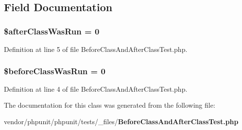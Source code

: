 \subsection{Field Documentation}
\subsubsection[{\$after\+Class\+Was\+Run}]{\setlength{\rightskip}{0pt plus 5cm}\$after\+Class\+Was\+Run = 0\hspace{0.3cm}{\ttfamily [static]}}\label{class_before_class_and_after_class_test_a46cf5fb3e71df7ff80751333fd0a9cff}


Definition at line 5 of file Before\+Class\+And\+After\+Class\+Test.\+php.

\subsubsection[{\$before\+Class\+Was\+Run}]{\setlength{\rightskip}{0pt plus 5cm}\$before\+Class\+Was\+Run = 0\hspace{0.3cm}{\ttfamily [static]}}\label{class_before_class_and_after_class_test_a4faedf112168c0be9ccc3926cbc47e1b}


Definition at line 4 of file Before\+Class\+And\+After\+Class\+Test.\+php.



The documentation for this class was generated from the following file\+:\begin{DoxyCompactItemize}
\item 
vendor/phpunit/phpunit/tests/\+\_\+files/{\bf Before\+Class\+And\+After\+Class\+Test.\+php}\end{DoxyCompactItemize}
